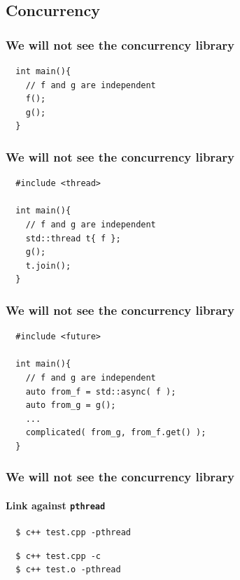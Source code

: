 \subsection{Concurrency}
\begin{frame}[fragile]
  \frametitle{We will not see the concurrency library \frownie }
\begin{lstlisting}
  int main(){
    // f and g are independent
    f();
    g();
  }
\end{lstlisting}
\end{frame}

\begin{frame}[fragile]
  \frametitle{We will not see the concurrency library  \frownie }
\begin{lstlisting}
  #include <thread>
    
  int main(){
    // f and g are independent
    std::thread t{ f };
    g();
    t.join();
  }
\end{lstlisting}

\end{frame}



\begin{frame}[fragile]
  \frametitle{We will not see the concurrency library \frownie }
\begin{lstlisting}
  #include <future>
    
  int main(){
    // f and g are independent
    auto from_f = std::async( f );
    auto from_g = g();
    ...
    complicated( from_g, from_f.get() );
  }
\end{lstlisting}
\end{frame}

\begin{frame}[fragile]
  \frametitle{We will not see the concurrency library \frownie }
  \framesubtitle{Link  against \texttt{pthread}}
\begin{lstlisting}
  $ c++ test.cpp -pthread
\end{lstlisting}
\vfill
\begin{lstlisting}
  $ c++ test.cpp -c
  $ c++ test.o -pthread
\end{lstlisting}

\end{frame}
